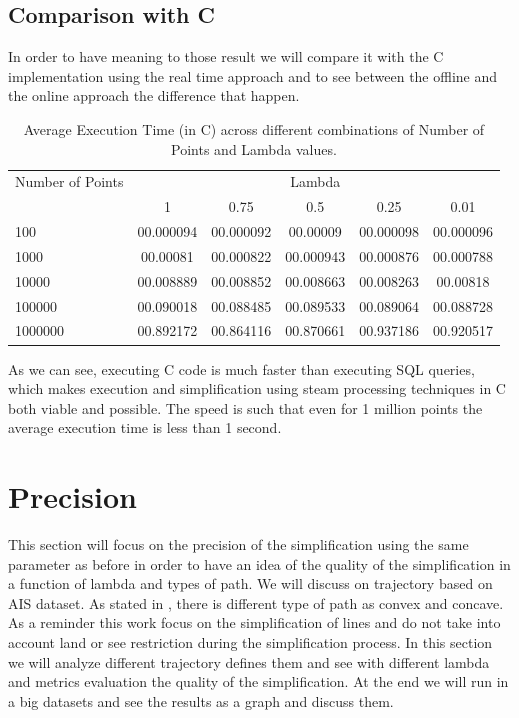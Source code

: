 \subsection{Comparison with C}
In order to have meaning to those result we will compare it with the C implementation using the real time approach and to see between the offline and the online approach the difference that happen.

\begin{table}[htbp]
    \centering
    \label{tab:execution_time_c}
    \begin{tabular}{@{}lccccc@{}}
        \toprule
        Number of Points & \multicolumn{5}{c}{Lambda} \\
        \cmidrule{2-6}
        & 1         & 0.75       & 0.5        & 0.25       & 0.01       \\
        \midrule
        100              & 00.000094 & 00.000092 & 00.00009 & 00.000098 & 00.000096 \\
        1000             & 00.00081  & 00.000822 & 00.000943 & 00.000876 & 00.000788 \\
        10000            & 00.008889 & 00.008852 & 00.008663 & 00.008263 & 00.00818 \\
        100000           & 00.090018  & 00.088485 & 00.089533 & 00.089064 & 00.088728 \\
        1000000          & 00.892172 & 00.864116 & 00.870661 & 00.937186 & 00.920517 \\
        \bottomrule
    \end{tabular}
    \caption{Average Execution Time (in C) across different combinations of Number of Points and Lambda values.}
\end{table}

As we can see, executing C code is much faster than executing SQL queries, which makes execution and simplification using steam processing techniques in C both viable and possible. The speed is such that even for 1 million points the average execution time is less than 1 second.

\section{Precision}
This section will focus on the precision of the simplification using the same parameter as before in order to have an idea of the quality of the simplification in a function of lambda and types of path. We will discuss on trajectory based on AIS dataset. As stated in \cite{abam2007streaming}, there is different type of path as convex and concave. As a reminder this work focus on the simplification of lines and do not take into account land or see restriction during the simplification process. In this section we will analyze different trajectory defines them and see with different lambda and metrics evaluation the quality of the simplification. At the end we will run in a big datasets and see the results as a graph and discuss them.

